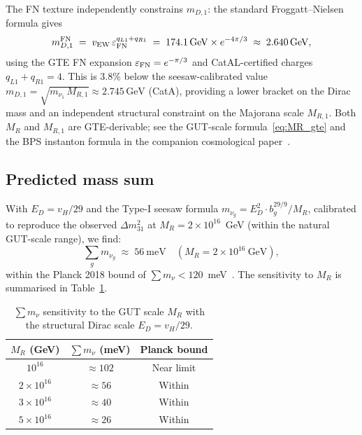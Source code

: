 \documentclass[12pt,a4paper]{article}
\theoremstyle{definition}
\theoremstyle{remark}
\begin{document}
The FN texture independently constrains $m_{D,1}$:
the standard Froggatt--Nielsen formula gives
\begin{equation}
  m_{D,1}^{\rm FN} \;=\; v_{\rm EW}\,\varepsilon_{\rm FN}^{q_{L1}+q_{R1}}
  \;=\; 174.1\,\text{GeV}\times e^{-4\pi/3} \;\approx\; 2.640\,\text{GeV},
  \label{eq:mD1_FN}
\end{equation}
using the GTE FN expansion $\varepsilon_{\rm FN} = e^{-\pi/3}$ and
CatAL-certified charges $q_{L1}+q_{R1} = 4$.
This is $3.8\%$ below the seesaw-calibrated value
$m_{D,1} = \sqrt{m_{\nu_1}\,M_{R,1}} \approx 2.745\,\text{GeV}$ (CatA),
providing a lower bracket on the Dirac mass and
an independent structural constraint on the Majorana scale $M_{R,1}$.
Both $M_R$ and $M_{R,1}$ are GTE-derivable; see the GUT-scale formula~\eqref{eq:MR_gte} and the BPS instanton formula in the companion cosmological paper~\cite{SpivackGTECosmology}.

\subsection{Predicted mass sum}
\label{subsec:sum}

With $E_D = v_H/29$ and the Type-I seesaw formula
$m_{\nu_g} = E_D^2 \cdot b_g^{29/9} / M_R$,
calibrated to reproduce the observed $\Delta m^2_{31}$ at
$M_R = 2 \times 10^{16}$~GeV (within the natural GUT-scale range),
we find:
\begin{equation}
  \sum_g m_{\nu_g} \;\approx\; 56~\text{meV} \quad
  (M_R = 2\times 10^{16}~\text{GeV}),
  \label{eq:sum_pred}
\end{equation}
within the Planck 2018 bound of $\sum m_\nu < 120$~meV~\cite{Planck2018}.
The sensitivity to $M_R$ is summarised in Table~\ref{tab:mgut}.

\begin{table}[h]
\centering
\caption{$\sum m_\nu$ sensitivity to the GUT scale $M_R$
with the structural Dirac scale $E_D = v_H/29$.}
\label{tab:mgut}
\renewcommand{\arraystretch}{1.15}
\begin{tabular}{ccc}
\toprule
$M_R$ (GeV) & $\sum m_\nu$ (meV) & Planck bound \\
\midrule
$10^{16}$ & $\approx 102$ & Near limit \\
$2\times 10^{16}$ & $\approx 56$ & Within \\
$3\times 10^{16}$ & $\approx 40$ & Within \\
$5\times 10^{16}$ & $\approx 26$ & Within \\
\bottomrule
\end{tabular}
\end{table}
\end{document}
